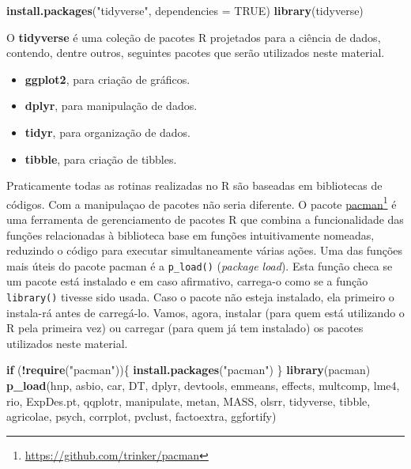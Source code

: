 \documentclass[
]{book}
\newenvironment{Shaded}{\begin{snugshade}}{\end{snugshade}}
\newcommand{\ControlFlowTok}[1]{\textcolor[rgb]{0.13,0.29,0.53}{\textbf{#1}}}
\newcommand{\DataTypeTok}[1]{\textcolor[rgb]{0.13,0.29,0.53}{#1}}
\newcommand{\KeywordTok}[1]{\textcolor[rgb]{0.13,0.29,0.53}{\textbf{#1}}}
\newcommand{\NormalTok}[1]{#1}
\newcommand{\OperatorTok}[1]{\textcolor[rgb]{0.81,0.36,0.00}{\textbf{#1}}}
\newcommand{\OtherTok}[1]{\textcolor[rgb]{0.56,0.35,0.01}{#1}}
\newcommand{\StringTok}[1]{\textcolor[rgb]{0.31,0.60,0.02}{#1}}
\providecommand{\tightlist}{%
  \setlength{\itemsep}{0pt}\setlength{\parskip}{0pt}}
\begin{document}
\begin{Shaded}
\begin{Highlighting}[]
\KeywordTok{install.packages}\NormalTok{(}\StringTok{"tidyverse"}\NormalTok{, }\DataTypeTok{dependencies =} \OtherTok{TRUE}\NormalTok{)}
\KeywordTok{library}\NormalTok{(tidyverse)}
\end{Highlighting}
\end{Shaded}

O \textbf{tidyverse} é uma coleção de pacotes R projetados para a ciência de dados, contendo, dentre outros, seguintes pacotes que serão utilizados neste material.

\begin{itemize}
\tightlist
\item
  \textbf{ggplot2}, para criação de gráficos.
\item
  \textbf{dplyr}, para manipulação de dados.
\item
  \textbf{tidyr}, para organização de dados.
\item
  \textbf{tibble}, para criação de tibbles.
\end{itemize}

Praticamente todas as rotinas realizadas no R são baseadas em bibliotecas de códigos. Com a manipulaçao de pacotes não seria diferente. O pacote \href{https://github.com/trinker/pacman}{pacman}\footnote{\url{https://github.com/trinker/pacman}} é uma ferramenta de gerenciamento de pacotes R que combina a funcionalidade das funções relacionadas à biblioteca base em funções intuitivamente nomeadas, reduzindo o código para executar simultaneamente várias ações. Uma das funções mais úteis do pacote pacman é a \texttt{p\_load()} (\emph{package load}). Esta função checa se um pacote está instalado e em caso afirmativo, carrega-o como se a função \texttt{library()} tivesse sido usada. Caso o pacote não esteja instalado, ela primeiro o instala-rá antes de carregá-lo. Vamos, agora, instalar (para quem está utilizando o R pela primeira vez) ou carregar (para quem já tem instalado) os pacotes utilizados neste material.

\begin{Shaded}
\begin{Highlighting}[]
\ControlFlowTok{if}\NormalTok{ (}\OperatorTok{!}\KeywordTok{require}\NormalTok{(}\StringTok{"pacman"}\NormalTok{))\{}
\KeywordTok{install.packages}\NormalTok{(}\StringTok{"pacman"}\NormalTok{)}
\NormalTok{\}}
\KeywordTok{library}\NormalTok{(pacman)}
\KeywordTok{p_load}\NormalTok{(hnp, asbio, car, DT, dplyr, devtools, emmeans, effects, multcomp,}
\NormalTok{       lme4, rio, ExpDes.pt, qqplotr, manipulate, metan, MASS, olsrr,}
\NormalTok{       tidyverse, tibble, agricolae, psych, corrplot, pvclust, factoextra, ggfortify)}
\end{Highlighting}
\end{Shaded}
\end{document}

